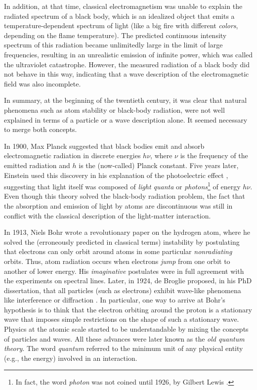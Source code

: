 \documentclass[onecolumn,nofootinbib, secnumarabic, amsmath, nobibnotes,12pt,aps,pra]{revtex4-1}
\begin{document}
In addition, at that time, classical electromagnetism was unable to
explain the radiated spectrum of a black body, which is an idealized
object that emits a temperature-dependent spectrum of light (like a
big fire with different \textit{colors}, depending on
the flame temperature). The predicted continuous intensity spectrum
of this radiation became unlimitedly large in the limit of large frequencies,
resulting in an unrealistic emission of infinite power, which was
called the ultraviolet catastrophe. However, the measured radiation
of a black body did not behave in this way, indicating that a wave
description of the electromagnetic field was also incomplete.

In summary, at the beginning of the twentieth century, it was clear that natural phenomena such as atom stability or black-body radiation, were not well explained in terms of a particle or a wave description alone. It seemed necessary to merge both concepts.

In 1900, Max Planck suggested \cite{om.Planck-BlackBody} that black
bodies emit and absorb electromagnetic radiation in discrete
energies $h\nu$, where $\nu$ is the frequency of the emitted
radiation and $h$ is the (now-called) Planck constant. Five years
later, Einstein used this discovery in his explanation of the
photoelectric effect \cite{om.Einstein-Photoelectric}, suggesting
that light itself was composed of \textit{light quanta} or
\textit{photons}\footnote{In fact, the word \textit{photon} was not
coined until 1926, by Gilbert Lewis \cite{om.gilbert1926}.} of
energy $h\nu$. Even though this theory solved the black-body
radiation problem, the fact that the absorption and emission of
light by atoms are discontinuous was still in conflict with the
classical description of the light-matter interaction.

In 1913, Niels Bohr \cite{om.bohr,om.bohr2,om.bohr3} wrote a
revolutionary paper on the hydrogen atom, where he solved the
(erroneously predicted in classical terms) instability by
postulating that electrons can only orbit around atoms in some
particular \textit{nonradiating} orbits. Thus, atom radiation occurs
when electrons \textit{jump} from one orbit to another of lower
energy. His \textit{imaginative} postulates were in full agreement
with the experiments on spectral lines. Later, in 1924, de Broglie
proposed, in his PhD dissertation, that all particles (such as
electrons) exhibit wave-like phenomena like interference or
diffraction \cite{om.debroglie1923}. In particular, one way to
arrive at Bohr's hypothesis is to think that the electron orbiting
around the proton is a stationary wave that imposes simple
restrictions on the shape of such a stationary wave. Physics at the
atomic scale started to be understandable by mixing the concepts of
particles and waves. All these advances were later known as the
\textit{old quantum theory}. The word \textit{quantum} referred to
the minimum unit of any physical entity (e.g., the energy) involved
in an interaction.
\end{document}
